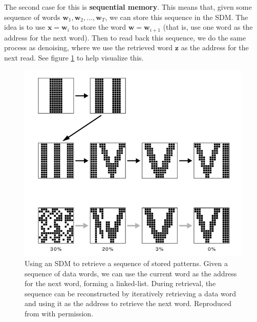 \documentclass[journal, onecolumn, 12pt, draftclsnofoot]{IEEEtran}
\newcommand{\kword}[1]{\textbf{#1}}
\newcommand{\mbf}[1]{\mathbf{#1}}
\begin{document}
	\par The second case for this is \kword{sequential memory}. This means that, given some sequence of words $\mbf{w}_1, \mbf{w}_2, \dots, \mbf{w}_T$, we can store this sequence in the SDM. The idea is to use $\mbf{x} = \mbf{w}_i$ to store the word $\mbf{w} = \mbf{w}_{i+1}$ (that is, use one word as the address for the next word).
	Then to read back this sequence, we do the same process as denoising, where we use the retrieved word $\mbf{z}$ as the address for the next read. See figure \ref{fig:SDM-linked-list} to help visualize this.
	\begin{figure}[ht]
		\begin{center}
		\includegraphics[scale=0.6]{fig/sdm-linked-list.png}
	\end{center}
		\caption{Using an SDM to retrieve a sequence of stored patterns. Given a sequence of data words, we can use the current word as the address for the next word, forming a linked-list. During retrieval, the sequence can be reconstructed by iteratively retrieving a data word and using it as the address to retrieve the next word. Reproduced from \cite{sdm} with permission.}
		\label{fig:SDM-linked-list}
	\end{figure}
\end{document}
